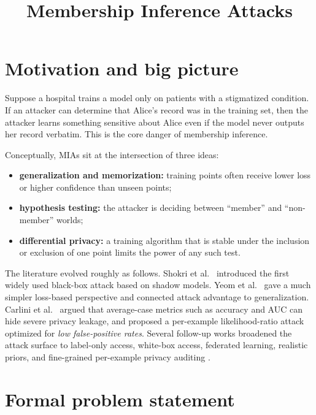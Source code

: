 \documentclass[11pt]{article}
\theoremstyle{definition}
\newcommand{\1}{\mathbf{1}}
\begin{document}
\title{Membership Inference Attacks}
\author{}
\date{}
\maketitle


\section{Motivation and big picture}

Suppose a hospital trains a model only on patients with a stigmatized condition. If an attacker can determine that Alice's record was in the training set, then the attacker learns something sensitive about Alice even if the model never outputs her record verbatim. This is the core danger of membership inference.

Conceptually, MIAs sit at the intersection of three ideas:
\begin{itemize}
    \item \textbf{generalization and memorization:} training points often receive lower loss or higher confidence than unseen points;
    \item \textbf{hypothesis testing:} the attacker is deciding between ``member'' and ``non-member'' worlds;
    \item \textbf{differential privacy:} a training algorithm that is stable under the inclusion or exclusion of one point limits the power of any such test.
\end{itemize}

The literature evolved roughly as follows. Shokri et al.~\cite{shokri2017} introduced the first widely used black-box attack based on shadow models. Yeom et al.~\cite{yeom2018} gave a much simpler loss-based perspective and connected attack advantage to generalization. Carlini et al.~\cite{carlini2022} argued that average-case metrics such as accuracy and AUC can hide severe privacy leakage, and proposed a per-example likelihood-ratio attack optimized for \emph{low false-positive rates}. Several follow-up works broadened the attack surface to label-only access, white-box access, federated learning, realistic priors, and fine-grained per-example privacy auditing \cite{salem2019,sablayrolles2019,nasr2019,songmittal2021,choquette2021,jayaraman2021,ye2022}.

\section{Formal problem statement}
\end{document}
